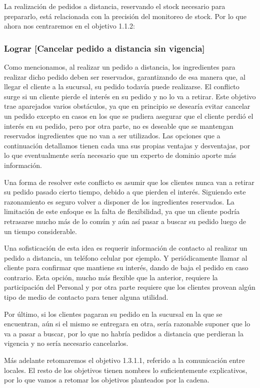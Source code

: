 \documentclass[a4paper,10pt]{article}
\begin{document}
\medskip

La realización de pedidos a distancia, reservando el stock necesario para prepararlo, está relacionada con la precisión del monitoreo de stock. Por lo que ahora nos centraremos en el objetivo 1.1.2:
\subsubsection*{Lograr [Cancelar pedido a distancia sin vigencia]}
Como mencionamos, al realizar un pedido a distancia, los ingredientes para realizar dicho pedido deben ser reservados, garantizando de esa manera que, al llegar el cliente a la sucursal, su pedido todavía puede realizarse. El conflicto surge si un cliente pierde el interés en su pedido y no lo va a retirar.
Este objetivo trae aparejados varios obstáculos, ya que en principio se desearía evitar cancelar un pedido excepto en casos en los que se pudiera asegurar que el cliente perdió el interés en su pedido, pero por otra parte, no es deseable que se mantengan reservados ingredientes que no van a ser utilizados.
Las opciones que a continuación detallamos tienen cada una sus propias ventajas y desventajas, por lo que eventualmente sería necesario que un experto de dominio aporte más información.


Una forma de resolver este conflicto es asumir que los clientes nunca van a retirar su pedido pasado cierto tiempo, debido a que pierden el interés. Siguiendo este razonamiento es seguro volver a disponer de los ingredientes reservados. La limitación de este enfoque es la falta de flexibilidad, ya que un cliente podría retrasarse mucho más de lo común y aún así pasar a buscar su pedido luego de un tiempo considerable.

Una sofisticación de esta idea es requerir información de contacto al realizar un pedido a distancia, un teléfono celular por ejemplo. Y periódicamente llamar al cliente para confirmar que mantiene su interés, dando de baja el pedido en caso contrario. Esta opción, mucho más flexible que la anterior, requiere la participación del Personal y por otra parte requiere que los clientes provean algún tipo de medio de contacto para tener alguna utilidad.

Por último, si los clientes pagaran su pedido en la sucursal en la que se encuentran, aún si el mismo se entregara en otra, sería razonable suponer que lo va a pasar a buscar, por lo que no habría pedidos a distancia que perdieran la vigencia y no sería necesario cancelarlos.

Más adelante retomaremos el objetivo 1.3.1.1, referido a la comunicación entre locales.
El resto de los objetivos tienen nombres lo suficientemente explicativos, por lo que vamos a retomar los objetivos planteados por la cadena.
\end{document}
